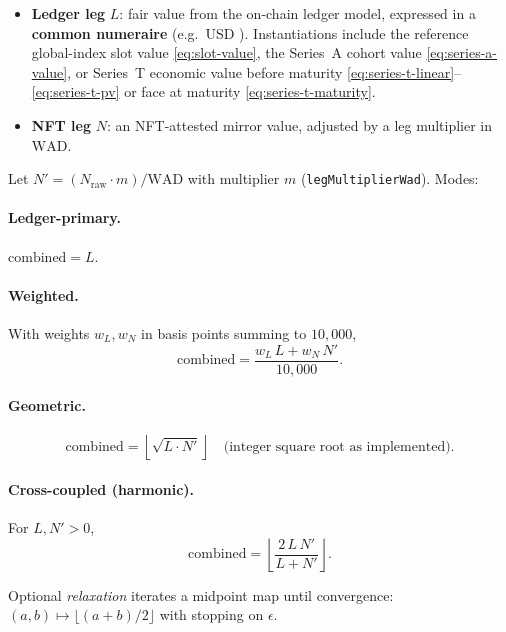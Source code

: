 \documentclass[11pt,a4paper]{article}
\newcommand{\WAD}{\mathrm{WAD}}
\newcommand{\minor}{\text{minor units}}
\begin{document}
\begin{itemize}[leftmargin=*]
  \item \textbf{Ledger leg} $L$: fair value from the on-chain ledger model, expressed in a \textbf{common numeraire} (e.g.\ USD \minor). Instantiations include the reference global-index slot value \eqref{eq:slot-value}, the Series~A cohort value \eqref{eq:series-a-value}, or Series~T economic value before maturity \eqref{eq:series-t-linear}--\eqref{eq:series-t-pv} or face at maturity \eqref{eq:series-t-maturity}.
  \item \textbf{NFT leg} $N$: an NFT-attested mirror value, adjusted by a leg multiplier in $\WAD$.
\end{itemize}

Let $N' = (N_{\mathrm{raw}} \cdot m)/\WAD$ with multiplier $m$ (\texttt{legMultiplierWad}). Modes:

\paragraph{Ledger-primary.}
$\mathrm{combined} = L$.

\paragraph{Weighted.}
With weights $w_L, w_N$ in basis points summing to $10{,}000$,
\begin{equation}
\mathrm{combined} = \frac{w_L\, L + w_N\, N'}{10{,}000}.
\end{equation}

\paragraph{Geometric.}
\begin{equation}
\mathrm{combined} = \left\lfloor \sqrt{L \cdot N'} \right\rfloor \quad \text{(integer square root as implemented).}
\end{equation}

\paragraph{Cross-coupled (harmonic).}
For $L, N' > 0$,
\begin{equation}
\mathrm{combined} = \left\lfloor \frac{2\, L\, N'}{L + N'} \right\rfloor .
\end{equation}

Optional \emph{relaxation} iterates a midpoint map until convergence:
$(a,b) \mapsto \bigl\lfloor (a+b)/2 \bigr\rfloor$ with stopping on $\epsilon$.
\end{document}
